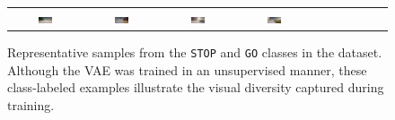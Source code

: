 \begin{figure}[htbp]
\begin{tabular}{cccccccccc}
        \includegraphics[width=0.2\textwidth]{img/diversity/go_07.png} &
        \includegraphics[width=0.2\textwidth]{img/diversity/go_08.png} &
        \includegraphics[width=0.2\textwidth]{img/diversity/go_09.png} &
        \includegraphics[width=0.2\textwidth]{img/diversity/go_10.png} \\
    \end{tabular}
    \caption[Dataset diversity — STOP and GO classes]{%
Representative samples from the \texttt{STOP} and \texttt{GO} classes in the dataset. Although the VAE was trained in an unsupervised manner, these class-labeled examples illustrate the visual diversity captured during training.}
    \label{fig:diversity_stop_go}
\end{figure}


